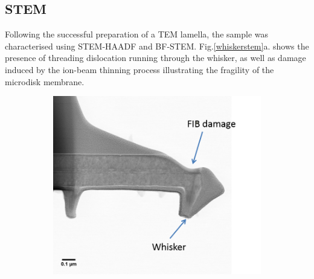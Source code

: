 \subsection{STEM}

Following the successful preparation of a TEM lamella, the sample was characterised using STEM-HAADF and BF-STEM. Fig.\ref{whiskerstem}a. shows the presence of threading dislocation running through the whisker, as well as damage induced by the ion-beam thinning process illustrating the fragility of the microdisk membrane.

\begin{figure}[h]
	\hspace*{0.5cm}
	\begin{subfigure}[b]{0.48\textwidth}
		\centering
		\includegraphics[width=1\linewidth]{Figs/Ch4/whiskBF}
		\caption{}
		

\end{subfigure}
\end{figure}
